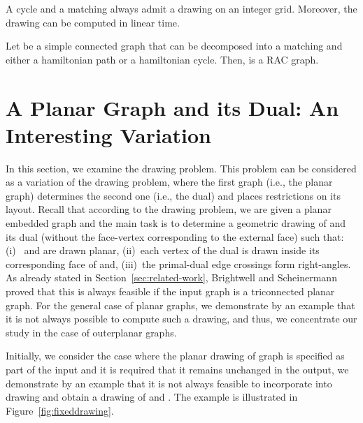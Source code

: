 \documentclass{llncs}
\begin{document}
\begin{theorem}
\label{thm:cycle-matching} A cycle and a matching always admit a
 drawing on an  integer grid. Moreover,
the drawing can be computed in linear time.
\end{theorem}



\begin{corollary}
\label{cor:cycle-matching} Let  be a simple connected graph that
can be decomposed into a matching and either a hamiltonian path or a
hamiltonian cycle. Then,  is a RAC graph.
\end{corollary}



\section{A Planar Graph and its Dual: An Interesting Variation}
\label{sec:planar-dual}


In this section, we examine the   drawing problem. This
problem can be considered as a variation of the  drawing
problem, where the first graph (i.e., the planar graph) determines
the second one (i.e., the dual) and places restrictions on its
layout. Recall that according to the  drawing problem, we
are given a planar embedded graph  and the main task is to
determine a geometric drawing of  and its dual  (without the
face-vertex corresponding to the external face) such that: (i)~
and  are drawn planar, (ii)~each vertex of the dual is drawn
inside its corresponding face of  and, (iii)~the primal-dual edge
crossings form right-angles. As already stated in
Section~\ref{sec:related-work}, Brightwell and
Scheinermann~\cite{BS93} proved that this is always feasible if the
input graph is a triconnected planar graph. For the general case of
planar graphs, we demonstrate by an example that it is not always
possible to compute such a drawing, and thus, we concentrate our
study in the case of outerplanar graphs.




Initially, we consider the case where the planar drawing 
of graph  is specified as part of the input and it is required
that it remains unchanged in the output, we demonstrate by an
example that it is not always feasible to incorporate  into
drawing  and obtain a  drawing of  and .
The example is illustrated in Figure~\ref{fig:fixeddrawing}.
\end{document}
